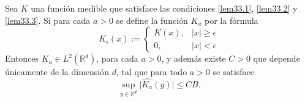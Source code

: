 \documentclass{myarticle}
\newcommand{\abs}[1]{\left|{#1}\right|}
\newcommand{\abss}[1]{\vert #1 \vert}
\newcommand{\reales}{\mathbb{R}}
\newcommand{\lp}[2]{L^{#1}(#2)}
\begin{document}
\begin{proposition}
Sea $K$ una función medible que satisface las condiciones \eqref{lem33.1}, \eqref{lem33.2} y \eqref{lem33.3}. Si
para cada $a>0$ se define la función $K_a$ por la fórmula
\begin{equation}\label{lem33.4}
  K_\epsilon(x):=
\left\{
\begin{array}{cc}
    K(x), &\abs{x}\geq\epsilon  \\
     0,&\abs{x}<\epsilon 
\end{array}
\right.  
\end{equation}
Entonces $K_a\in\lp{2}{\reales^d}$, para cada $a>0$, y además existe $C>0$ que depende únicamente de la dimensión $d$, tal que para todo $a>0$ se satisface
$$\sup_{y\in\reales^d}\abss{\widehat{K_a}(y)}\leq CB.$$
\end{proposition}
\end{document}
